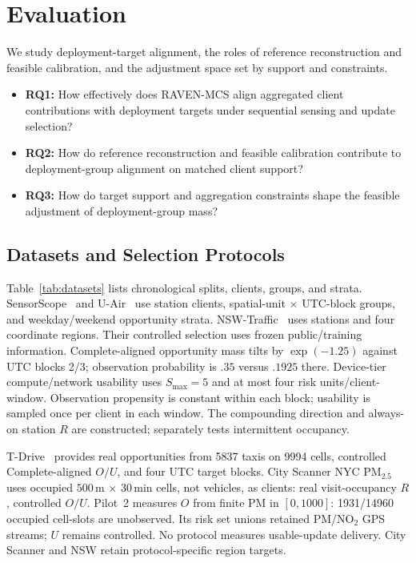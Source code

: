 \documentclass[letterpaper,journal]{IEEEtran}
\begin{document}
\FloatBarrier
\section{Evaluation}
\label{sec:evaluation}

We study deployment-target alignment, the roles of reference reconstruction and
feasible calibration, and the adjustment space set by support and constraints.
\begin{itemize}
\item \textbf{RQ1:} How effectively does RAVEN-MCS align aggregated client
contributions with deployment targets under sequential sensing and update selection?
\item \textbf{RQ2:} How do reference reconstruction and feasible calibration
contribute to deployment-group alignment on matched client support?
\item \textbf{RQ3:} How do target support and aggregation constraints shape
the feasible adjustment of deployment-group mass?
\end{itemize}

\subsection{Datasets and Selection Protocols}
\label{subsec:eval_setup}

Table~\ref{tab:datasets} lists chronological splits, clients, groups, and strata.
SensorScope~\cite{ingelrest2010sensorscope,barrenetxea2019sensorscope} and
U-Air~\cite{zheng2013uair} use station clients, spatial-unit $\times$ UTC-block
groups, and weekday/weekend opportunity strata. NSW-Traffic~\cite{tfnsw2024traffic}
uses stations and four coordinate regions. Their controlled selection uses
frozen public/training information. Complete-aligned opportunity mass tilts
by $\exp(-1.25)$ against UTC blocks 2/3; observation probability is
$.35$ versus $.1925$ there. Device-tier compute/network usability uses
$S_{\max}=5$ and at most four risk units/client-window. Observation propensity
is constant within each block; usability is sampled once per client in each window. The compounding
direction and always-on station $R$ are constructed; 
separately tests intermittent occupancy.

T-Drive~\cite{yuan2010tdrive} provides real opportunities from 5837 taxis on
9994 cells, controlled Complete-aligned $O/U$, and four UTC target blocks.
City Scanner NYC PM$_{2.5}$ uses occupied $500$\,m $\times$ $30$\,min cells,
not vehicles, as clients: real visit-occupancy $R$, controlled $O/U$.
Pilot~2 measures $O$ from finite PM in $[0,1000]$: 1931/14960 occupied
cell-slots are unobserved. Its risk set unions retained PM/NO$_2$ GPS streams;
$U$ remains controlled. No protocol measures usable-update delivery.
City Scanner and NSW retain protocol-specific region targets.
\end{document}

